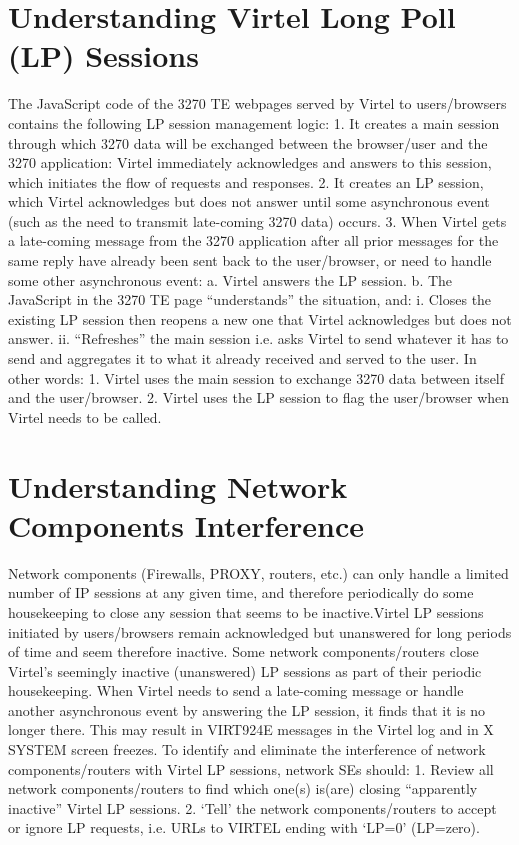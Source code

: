 \documentclass[letterpaper,10pt,english]{sphinxmanual}
\begin{document}
\section{Understanding Virtel Long Poll (LP) Sessions}
\label{\detokenize{connectivity_guide:understanding-virtel-long-poll-lp-sessions}}
The JavaScript code of the 3270 TE webpages served by Virtel to users/browsers contains the following LP session management logic:
1.      It creates a main session through which 3270 data will be exchanged between the browser/user and the 3270 application: Virtel immediately acknowledges and answers to this session, which initiates the flow of requests and responses.
2.      It creates an LP session, which Virtel acknowledges but does not answer until some asynchronous event (such as the need to transmit late-coming 3270 data) occurs.
3.      When Virtel gets a late-coming message from the 3270 application after all prior messages for the same reply have already been sent back to the user/browser, or need to handle some other asynchronous event:
a.      Virtel answers the LP session.
b.      The JavaScript in the 3270 TE page “understands” the situation, and:
i.      Closes the existing LP session then reopens a new one that Virtel acknowledges but does not answer.
ii.     “Refreshes” the main session i.e. asks Virtel to send whatever it has to send and aggregates it to what it already received and served to the user.
In other words:
1.      Virtel uses the main session to exchange 3270 data between itself and the user/browser.
2.      Virtel uses the LP session to flag the user/browser when Virtel needs to be called.


\section{Understanding Network Components Interference}
\label{\detokenize{connectivity_guide:understanding-network-components-interference}}
Network components (Firewalls, PROXY, routers, etc.) can only handle a limited number of IP sessions at any given time, and therefore periodically do some housekeeping to close any session that seems to be inactive.Virtel LP sessions initiated by users/browsers remain acknowledged but unanswered for long periods of time and seem therefore inactive. Some network components/routers close Virtel’s seemingly inactive (unanswered) LP sessions as part of their periodic housekeeping. When Virtel needs to send a late-coming message or handle another asynchronous event by answering the LP session, it finds that it is no longer there. This may result in VIRT924E messages in the Virtel log and in X SYSTEM screen freezes. To identify and eliminate the interference of network components/routers with Virtel LP sessions, network SEs should:
1.      Review all network components/routers to find which one(s) is(are) closing “apparently inactive” Virtel LP sessions.
2.      ‘Tell’ the network components/routers to accept or ignore LP requests, i.e. URLs to VIRTEL ending with ‘LP=0’ (LP=zero).
\end{document}
